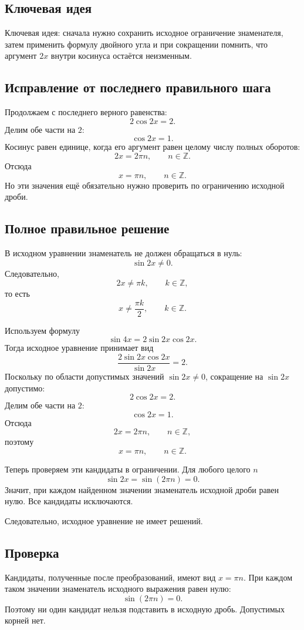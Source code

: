\documentclass[12pt,a4paper]{article}
\begin{document}
\subsection*{Ключевая идея}
\textcolor{blue!60!black}{Ключевая идея:} сначала нужно сохранить исходное ограничение знаменателя, затем применить формулу двойного угла и при сокращении помнить, что аргумент $2x$ внутри косинуса остаётся неизменным.

\subsection*{Исправление от последнего правильного шага}
Продолжаем с последнего верного равенства:
\[
2\cos 2x=2.
\]
Делим обе части на $2$:
\[
\cos 2x=1.
\]
Косинус равен единице, когда его аргумент равен целому числу полных оборотов:
\[
2x=2\pi n,\qquad n\in\mathbb Z.
\]
Отсюда
\[
x=\pi n,\qquad n\in\mathbb Z.
\]
Но эти значения ещё обязательно нужно проверить по ограничению исходной дроби.

\subsection*{Полное правильное решение}
В исходном уравнении знаменатель не должен обращаться в нуль:
\[
\sin 2x\ne 0.
\]
Следовательно,
\[
2x\ne \pi k,\qquad k\in\mathbb Z,
\]
то есть
\[
x\ne \frac{\pi k}{2},\qquad k\in\mathbb Z.
\]

Используем формулу
\[
\sin 4x=2\sin 2x\cos 2x.
\]
Тогда исходное уравнение принимает вид
\[
\frac{2\sin 2x\cos 2x}{\sin 2x}=2.
\]
Поскольку по области допустимых значений $\sin 2x\ne 0$, сокращение на $\sin 2x$ допустимо:
\[
2\cos 2x=2.
\]
Делим обе части на $2$:
\[
\cos 2x=1.
\]
Отсюда
\[
2x=2\pi n,\qquad n\in\mathbb Z,
\]
поэтому
\[
x=\pi n,\qquad n\in\mathbb Z.
\]

Теперь проверяем эти кандидаты в ограничении. Для любого целого $n$
\[
\sin 2x=\sin(2\pi n)=0.
\]
Значит, при каждом найденном значении знаменатель исходной дроби равен нулю. Все кандидаты исключаются.

Следовательно, исходное уравнение не имеет решений.

\subsection*{Проверка}
Кандидаты, полученные после преобразований, имеют вид $x=\pi n$. При каждом таком значении знаменатель исходного выражения равен нулю:
\[
\sin(2\pi n)=0.
\]
Поэтому ни один кандидат нельзя подставить в исходную дробь. Допустимых корней нет.
\end{document}
